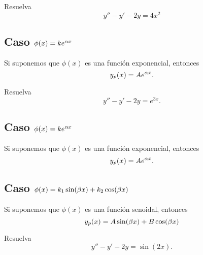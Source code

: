 {}



\begin{problema}
	\label{bron:exmp:11.1}
	Resuelva
	$$
	y''-y'-2y=4x^{2}
	$$
\end{problema}




\subsection{Caso $\phi(x)=ke^{\alpha x}$}
Si suponemos que $\phi(x)$ es una funci\'on exponencial, entonces
\begin{equation}
	\label{bron:11.1}
	y_{p}(x)=Ae^{\alpha x}.
\end{equation}





\begin{problema}
	\label{bron:exmp:11.2}
	Resuelva
	$$
	y''-y'-2y=e^{3x}.
	$$
\end{problema}




\subsection{Caso $\phi(x)=ke^{\alpha x}$}
Si suponemos que $\phi(x)$ es una funci\'on exponencial, entonces
\begin{equation}
	\label{bron:11.2}
	y_{p}(x)=Ae^{\alpha x}.
\end{equation}




\subsection{Caso $\phi(x)=k_{1}\sin(\beta x)+k_{2}\cos(\beta x)$}
Si suponemos que $\phi(x)$ es una funci\'on senoidal, entonces
\begin{equation}
	\label{bron:11.3}
	y_{p}(x)=A\sin(\beta x)+B\cos(\beta x)
\end{equation}




\begin{problema}
	\label{bron:exmp:11.3}
	Resuelva
	$$
	y''-y'-2y=\sin(2x).
	$$
\end{problema}



